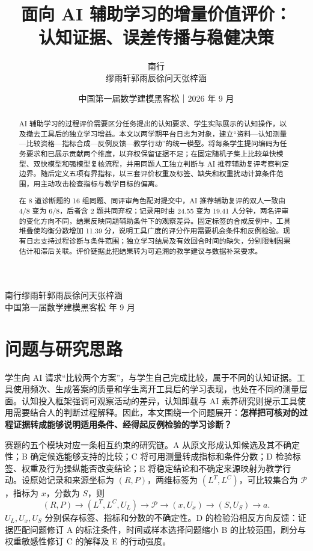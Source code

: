 \documentclass[withoutpreface,bwprint]{cumcmthesis}
\title{\texorpdfstring{面向 AI 辅助学习的增量价值评价：\\认知证据、误差传播与稳健决策}{面向 AI 辅助学习的增量价值评价：认知证据、误差传播与稳健决策}}
\author{南行\\缪雨轩\quad 郭雨辰\quad 徐问天\quad 张梓涵}
\date{中国第一届数学建模黑客松｜2026 年 9 月}
\begin{document}
\maketitle
\begin{center}\small 南行\quad 缪雨轩\quad 郭雨辰\quad 徐问天\quad 张梓涵\\
中国第一届数学建模黑客松 年 9 月\end{center}
\begin{abstract}
AI 辅助学习的过程评价需要区分任务提出的认知要求、学生实际展示的认知操作，以及撤去工具后的独立学习增益。本文以两学期平台日志为对象，建立“资料—认知测量—比较资格—指标合成—反例反馈—教学行动”的统一模型。将每条学生提问编码为任务要求和已展示贡献两个维度，以弃权保留证据不足；在固定随机子集上比较单快模型、双快模型和强模型复核流程，并用同题人工独立判断与 AI 推荐辅助复评考察判定边界。随后定义五项有界指标，以三套评价权重及标签、缺失和权重扰动计算条件范围，用主动攻击检查指标与教学目标的偏离。

\FinalAbstractResults{}

在 8 道诊断题的 16 组同题、同评审角色配对提交中，AI 推荐辅助复评的双人一致由 4/8 变为 6/8，后者含 2 题共同弃权；记录用时由 24.55 变为 19.41 人分钟，两名评审的变化方向不同，结果反映同题辅助条件下的观察差异。固定标签的合成反例中，工具堆叠使均衡分数增加 11.39 分，说明工具广度的评分作用需要机会条件和反例检验。现有日志支持过程诊断与条件范围；独立学习结局及有效回合时间的缺失，分别限制因果估计和滞后关联。评价链据此把结果转为可追溯的教学建议与数据补采要求。
\end{abstract}

\section{问题与研究思路}
学生向 AI 请求“比较两个方案”，与学生自己完成比较，属于不同的认知证据。工具使用频次、生成答案的质量和学生离开工具后的学习表现，也处在不同的测量层面。认知投入框架强调可观察活动的差异，认知卸载与 AI 素养研究则提示工具使用需要结合人的判断过程解释\cite{chi2014_icap,risko2016_offloading,long2020_literacy}。因此，本文围绕一个问题展开：\textbf{怎样把可核对的过程证据转成能够说明适用条件、经得起反例检验的学习诊断？}

赛题的五个模块对应一条相互约束的研究链。A 从原文形成认知候选及其不确定性；B 确定候选能够支持的比较；C 将可用测量转成指标和条件分数；D 检验标签、权重及行为操纵能否改变结论；E 将稳定结论和不确定来源映射为教学行动。设原始记录和来源坐标为 $(R,P)$，两维标签为 $(L^T,L^C)$，可比较集合为 $\mathcal P$，指标为 $x$，分数为 $S$，则
\begin{equation}\label{eq:chain}
(R,P)\longrightarrow(L^T,L^C,U_L)\longrightarrow\mathcal P
\longrightarrow(x,U_x)\longrightarrow(S,U_S)\longrightarrow a.
\end{equation}
$U_L,U_x,U_S$ 分别保存标签、指标和分数的不确定性。D 的检验沿相反方向反馈：证据匹配问题修订 A 的标注条件，时间或样本选择问题缩小 B 的比较范围，刷分与权重敏感性修订 C 的解释及 E 的行动强度。
\end{document}
